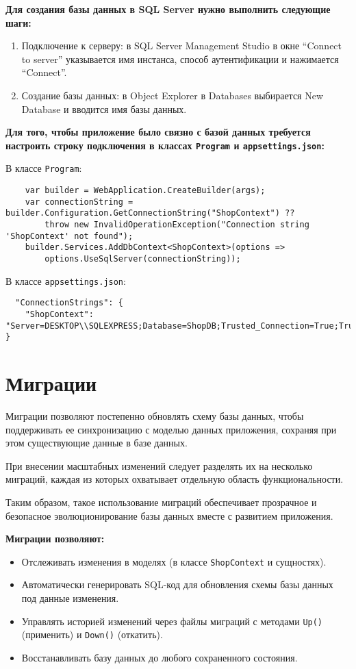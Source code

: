 \documentclass[a4paper,12pt]{report}
\begin{document}
\textbf{Для создания базы данных в SQL Server нужно выполнить следующие шаги:}
\begin{enumerate}
    \item
        Подключение к серверу: в SQL Server Management Studio в окне ``Connect to server'' 
        указывается имя инстанса, способ аутентификации и нажимается ``Connect''.
    \item
        Создание базы данных: в Object Explorer в Databases выбирается New Database 
        и вводится имя базы данных.
\end{enumerate}

\textbf{Для того, чтобы приложение было связно с базой данных требуется настроить 
строку подключения в классах \texttt{Program} и \texttt{appsettings.json}:}

В классе \texttt{Program}:
\begin{verbatim}
    var builder = WebApplication.CreateBuilder(args);
    var connectionString = builder.Configuration.GetConnectionString("ShopContext") ??
        throw new InvalidOperationException("Connection string 'ShopContext' not found");
    builder.Services.AddDbContext<ShopContext>(options =>
        options.UseSqlServer(connectionString));
\end{verbatim}

В классе \texttt{appsettings.json}:
\begin{verbatim}
  "ConnectionStrings": {
    "ShopContext": "Server=DESKTOP\\SQLEXPRESS;Database=ShopDB;Trusted_Connection=True;TrustServerCertificate=True;"
}
\end{verbatim}
    
\section{Миграции}

Миграции позволяют постепенно обновлять схему базы данных, чтобы поддерживать ее синхронизацию 
с моделью данных приложения, сохраняя при этом существующие данные в базе данных.\cite{migration}

При внесении масштабных изменений следует разделять их на несколько миграций, каждая из которых охватывает отдельную область функциональности.

Таким образом, такое использование миграций обеспечивает прозрачное и безопасное эволюционирование базы данных вместе с развитием приложения.

\textbf{Миграции позволяют:}
\begin{itemize}
    \item
        Отслеживать изменения в моделях (в классе \texttt{ShopContext} и сущностях).
    \item
        Автоматически генерировать \acs{SQL}-код для обновления схемы базы данных под данные изменения.
    \item
        Управлять историей изменений через файлы миграций с методами \texttt{Up()} (применить) и \texttt{Down()} (откатить).
    \item
        Восстанавливать базу данных до любого сохраненного состояния.
\end{itemize}
\end{document}
